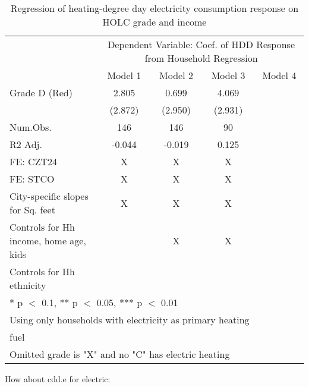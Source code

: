 \documentclass[
]{article}
\begin{document}
\begin{table}

\caption{\label{tab:ResponseOutpute1}Regression of heating-degree day electricity consumption response on HOLC grade and income\label{tab:responseelectric1}}
\centering
\begin{tabular}[t]{lccc>{}c}
\toprule
\multicolumn{1}{c}{ } & \multicolumn{4}{c}{Dependent Variable: Coef. of HDD Response from Household Regression} \\
\cmidrule(l{3pt}r{3pt}){2-5}
  & Model 1 & Model 2 & Model 3 & Model 4\\
\midrule
Grade D (Red) & 2.805 & 0.699 & 4.069 & \cellcolor{blue}{\textcolor{white}{2.393}}\\
 & (2.872) & (2.950) & (2.931) & \cellcolor{blue}{\textcolor{white}{(4.040)}}\\
\midrule
Num.Obs. & 146 & 146 & 90 & \cellcolor{blue}{\textcolor{white}{85}}\\
R2 Adj. & -0.044 & -0.019 & 0.125 & \cellcolor{blue}{\textcolor{white}{0.092}}\\
FE: CZT24 & X & X & X & \cellcolor{blue}{\textcolor{white}{X}}\\
FE: STCO & X & X & X & \cellcolor{blue}{\textcolor{white}{X}}\\
City-specific slopes for Sq. feet & X & X & X & \cellcolor{blue}{\textcolor{white}{X}}\\
Controls for Hh income, home age, kids &  & X & X & \cellcolor{blue}{\textcolor{white}{X}}\\
Controls for Hh ethnicity &  &  &  & \cellcolor{blue}{\textcolor{white}{X}}\\
\bottomrule
\multicolumn{5}{l}{\textsuperscript{} * p $<$ 0.1, ** p $<$ 0.05, *** p $<$ 0.01}\\
\multicolumn{5}{l}{\textsuperscript{} Using only households with electricity as primary heating}\\
\multicolumn{5}{l}{fuel}\\
\multicolumn{5}{l}{\textsuperscript{} Omitted grade is "X" and no "C" has electric heating}\\
\end{tabular}
\end{table}

How about cdd.e for electric:
\end{document}
